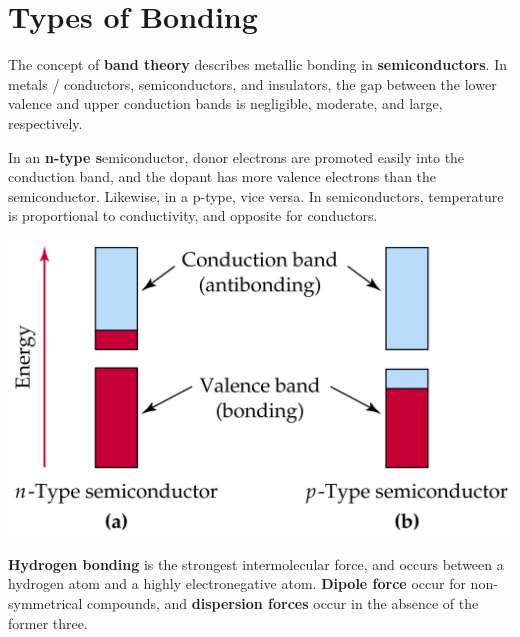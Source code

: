 \documentclass{tufte-book}
\renewcommand{\emph}[1]{\textbf{#1}}
\begin{document}
\section{Types of Bonding}
The concept of \emph{band theory} describes metallic bonding in \emph{semiconductors}. In metals / conductors, semiconductors, and insulators, the gap between the lower valence and upper conduction bands is negligible, moderate, and large, respectively.

\bigskip
In an \emph{n-type s}emiconductor, donor electrons are promoted easily into the conduction band, and the dopant has more valence electrons than the semiconductor. Likewise, in a p-type, vice versa. In semiconductors, temperature is proportional to conductivity, and opposite for conductors.

\begin{marginfigure}
\begin{center}
  \includegraphics[width=\textwidth]{semi}
\end{center}
\end{marginfigure}

\bigskip
\emph{Hydrogen bonding} is the strongest intermolecular force, and occurs between a hydrogen atom and a highly electronegative atom. \emph{Dipole force} occur for non-symmetrical compounds, and \emph{dispersion forces} occur in the absence of the former three.
\end{document}
